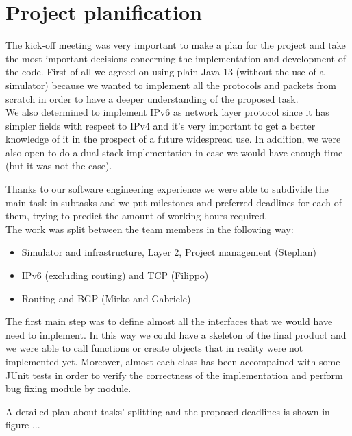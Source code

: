 \chapter{Project planification}

The kick-off meeting was very important to make a plan for the project and take the most important
decisions concerning the implementation and development of the code.
First of all we agreed on using plain Java 13 (without the use of a simulator) because we
wanted to implement all the protocols and packets from scratch in order to have a deeper
understanding of the proposed task.\\
We also determined to implement IPv6 as network layer protocol since it has simpler fields with respect to IPv4 and
it's very important to get a better knowledge of it in the prospect of a future widespread use. In addition, we were
also open to do a dual-stack implementation in case we would have enough time (but it was not the case).

Thanks to our software engineering experience we were able to subdivide the main task in
subtasks and we put milestones and preferred deadlines for each of them, trying to predict
the amount of working hours required.\\
The work was split between the team members in the following way:
\begin{itemize}
    \item Simulator and infrastructure, Layer 2, Project management (Stephan)
    \item IPv6 (excluding routing) and TCP (Filippo)
    \item Routing and BGP (Mirko and Gabriele)
\end{itemize}

The first main step was to define almost all the interfaces that we would have need to implement.
In this way we could have a skeleton of the final product and we were able to call functions
or create objects that in reality were not implemented yet.
Moreover, almost each class has been accompained with some JUnit tests in order to verify
the correctness of the implementation and perform bug fixing module by module.

A detailed plan about tasks' splitting and the proposed deadlines is shown in figure ...


